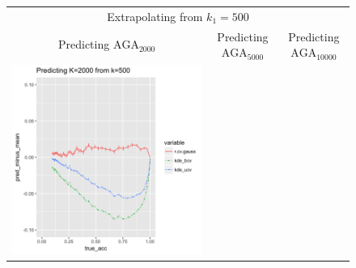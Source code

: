 \documentclass[twoside,11pt]{article}
\newenvironment{myfont}{\fontfamily{phv}\selectfont}{\par}
\begin{document}
\begin{figure}
\centering
\begin{tabular}{ccc}
\multicolumn{3}{c}{\begin{myfont}Extrapolating from $k_1 = 500$\end{myfont}}\\
\begin{myfont}Predicting $\text{AGA}_{2000}$\end{myfont} &
\begin{myfont}Predicting $\text{AGA}_{5000}$\end{myfont} &
\begin{myfont}Predicting $\text{AGA}_{10000}$\end{myfont}\\
\includegraphics[scale = 0.45, clip = true, trim = .22in 0 1.23in 0.4in]{sim_large7_biaz_K2_k0_5.png} &

\end{tabular}
\end{figure}
\end{document}
